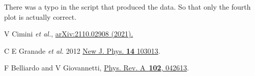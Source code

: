 \documentclass[aps, pra, 10pt, twocolumn, superscriptaddress,floatfix]{revtex4-1}
\begin{document}
{\color{blue} There was a typo in the script that produced the data. So that only the fourth plot is actually correct.}

\begin{thebibliography}{100}
	
	 V Cimini \textit{et al.}, \href{http://arxiv.org/abs/2110.02908}{arXiv:2110.02908 (2021).}
	
	 C E Granade \textit{et al.} 2012 \href{https://doi.org/10.1088/1367-2630/14/10/103013}{New J. Phys. {\bf 14} 103013}.
	
	
	 F Belliardo and V Giovannetti, \href{https://link.aps.org/doi/10.1103/PhysRevA.102.042613}{Phys. Rev. A~{\bf 102}, 042613}.
	

	
\end{thebibliography}
\end{document}
